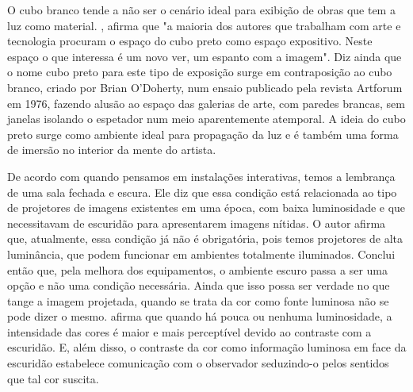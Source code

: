O cubo branco tende a não ser o cenário ideal para exibição de obras que tem a luz como material. , afirma que "a maioria dos autores que trabalham com arte e tecnologia procuram o espaço do cubo preto como espaço expositivo. Neste espaço o que interessa é um novo ver, um espanto com a imagem". Diz ainda que o nome cubo preto para este tipo de exposição surge em contraposição ao cubo branco, criado por Brian O'Doherty, num ensaio publicado pela revista Artforum em 1976, fazendo alusão ao espaço das galerias de arte, com paredes brancas, sem janelas isolando o espetador num meio aparentemente atemporal. A ideia do cubo preto surge como ambiente ideal para propagação da luz e é também uma forma de imersão no interior da mente do artista.

De acordo com  quando pensamos em instalações interativas, temos a lembrança de uma sala fechada e escura. Ele diz que essa condição está relacionada ao tipo de projetores de imagens existentes em uma época, com baixa luminosidade e que necessitavam de escuridão para apresentarem imagens nítidas. O autor afirma que, atualmente, essa condição já não é obrigatória, pois temos projetores de alta luminância, que podem funcionar em ambientes totalmente iluminados. Conclui então que, pela melhora dos equipamentos, o ambiente escuro passa a ser uma opção e não uma condição necessária. Ainda que isso possa ser verdade no que tange a imagem projetada, quando se trata da cor como fonte luminosa não se pode dizer o mesmo.  afirma que quando há pouca ou nenhuma luminosidade, a intensidade das cores é maior e mais perceptível devido ao contraste com a escuridão. E, além disso, o contraste da cor como informação luminosa em face da escuridão estabelece comunicação com o observador seduzindo-o pelos sentidos que tal cor suscita.

